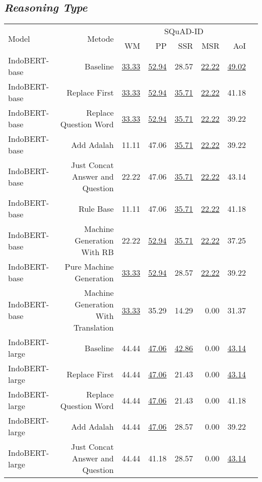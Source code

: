 \subsection*{\emph{Reasoning Type}}
\begin{table}[H]\centering
\footnotesize
\begin{tabular}{lrrrrrrr}\toprule
\multirow{2}{*}{Model} &\multirow{2}{*}{Metode} &\multicolumn{5}{c}{SQuAD-ID} \\\cmidrule{3-7}
& &WM &PP &SSR &MSR &AoI \\\midrule
IndoBERT-base &Baseline &\underline{33.33} &\underline{52.94} &28.57 &\underline{22.22} &\underline{49.02} \\
IndoBERT-base &Replace First &\underline{33.33} &\underline{52.94} &\underline{35.71} &\underline{22.22} &41.18 \\
IndoBERT-base &Replace Question Word &\underline{33.33} &\underline{52.94} &\underline{35.71} &\underline{22.22} &39.22 \\
IndoBERT-base &Add Adalah &11.11 &47.06 &\underline{35.71} &\underline{22.22} &39.22 \\
IndoBERT-base &Just Concat Answer and Question &22.22 &47.06 &\underline{35.71} &\underline{22.22} &43.14 \\
IndoBERT-base &Rule Base &11.11 &47.06 &\underline{35.71} &\underline{22.22} &41.18 \\
IndoBERT-base &Machine Generation With RB &22.22 &\underline{52.94} &\underline{35.71} &\underline{22.22} &37.25 \\
IndoBERT-base &Pure Machine Generation &\underline{33.33} &\underline{52.94} &28.57 &\underline{22.22} &39.22 \\
IndoBERT-base &Machine Generation With Translation &\underline{33.33} &35.29 &14.29 &0.00 &31.37 \\
\hline
IndoBERT-large &Baseline &44.44 &\underline{47.06} &\underline{42.86} &0.00 &\underline{43.14} \\
IndoBERT-large &Replace First &44.44 &\underline{47.06} &21.43 &0.00 &\underline{43.14} \\
IndoBERT-large &Replace Question Word &44.44 &\underline{47.06} &21.43 &0.00 &41.18 \\
IndoBERT-large &Add Adalah &44.44 &\underline{47.06} &28.57 &0.00 &39.22 \\
IndoBERT-large &Just Concat Answer and Question &44.44 &41.18 &28.57 &0.00 &\underline{43.14} \\

\end{tabular}
\end{table}
